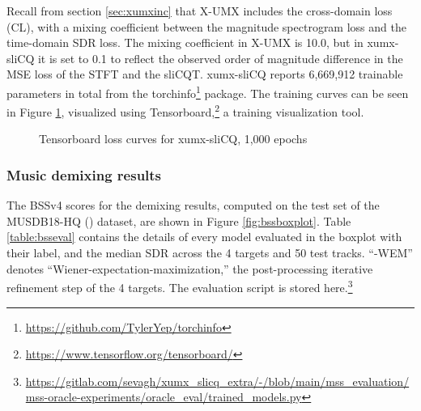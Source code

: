 \documentclass[report.tex]{subfiles}
\begin{document}
Recall from section \ref{sec:xumxinc} that X-UMX includes the cross-domain loss (CL), with a mixing coefficient between the magnitude spectrogram loss and the time-domain SDR loss. The mixing coefficient in X-UMX is 10.0, but in xumx-sliCQ it is set to 0.1 to reflect the observed order of magnitude difference in the MSE loss of the STFT and the sliCQT. xumx-sliCQ reports 6,669,912 trainable parameters in total from the torchinfo\footnote{\url{https://github.com/TylerYep/torchinfo}} package. The training curves can be seen in Figure \ref{fig:networkloss}, visualized using Tensorboard,\footnote{\url{https://www.tensorflow.org/tensorboard/}} a training visualization tool.

\begin{figure}[ht]
	\centering
	\hspace{0.5em}
	\caption{Tensorboard loss curves for xumx-sliCQ, 1,000 epochs}
	\label{fig:networkloss}
\end{figure}

\newpagefill

\subsubsection{Music demixing results}
\label{sec:demixresults}

The BSSv4 scores for the demixing results, computed on the test set of the MUSDB18-HQ (\cite{musdb18hq}) dataset, are shown in Figure \ref{fig:bssboxplot}. Table \ref{table:bsseval} contains the details of every model evaluated in the boxplot with their label, and the median SDR across the 4 targets and 50 test tracks. ``-WEM'' denotes ``Wiener-expectation-maximization,'' the post-processing iterative refinement step of the 4 targets. The evaluation script is stored here.\footnote{\url{https://gitlab.com/sevagh/xumx_slicq_extra/-/blob/main/mss_evaluation/mss-oracle-experiments/oracle_eval/trained_models.py}}
\end{document}
